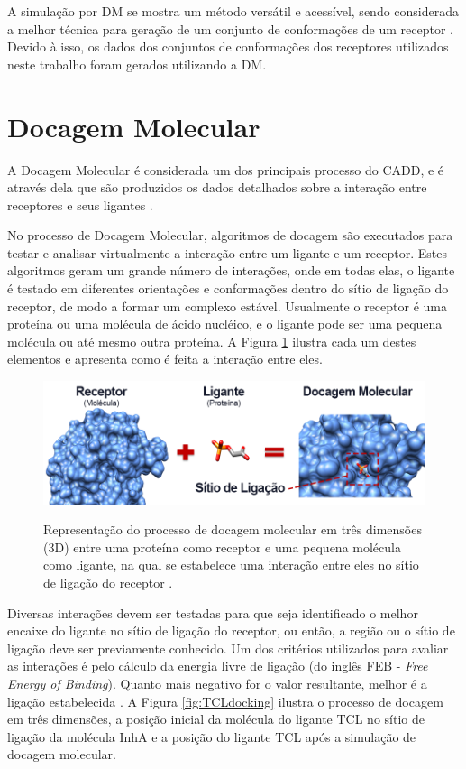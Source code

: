 A simulação por DM se mostra um método versátil e acessível, sendo considerada a melhor técnica para geração de um conjunto de conformações de um receptor \cite{kar11}. Devido à isso, os dados dos conjuntos de conformações dos receptores utilizados neste trabalho foram gerados utilizando a DM.


\section{Docagem Molecular}

A Docagem Molecular é considerada um dos principais processo do CADD, e é através dela que são produzidos os dados detalhados sobre a interação entre receptores e seus ligantes \cite{LEN96}. 

No processo de Docagem Molecular, algoritmos de docagem são executados para testar e analisar virtualmente a interação entre um ligante e um receptor. Estes algoritmos geram um grande número de interações, onde em todas elas, o ligante é testado em diferentes orientações e conformações dentro do sítio de ligação do receptor, de modo a formar um complexo estável. 
Usualmente o receptor é uma proteína ou uma molécula de ácido nucléico, e o ligante pode ser uma pequena molécula ou até mesmo outra proteína. A Figura \ref{fig:docking} \cite{ALE13} ilustra cada um destes elementos e apresenta como é feita a interação entre eles.

\begin{figure}[h]
	\center
	\includegraphics[width=14cm]{images/docking.png}
	\label{fig:docking}
	\caption{Representação do processo de docagem molecular em três dimensões (3D) entre uma proteína como receptor e uma pequena molécula como ligante, na qual se estabelece uma interação entre eles no sítio de ligação do receptor \cite{ALE13}.}
\end{figure}

Diversas interações devem ser testadas para que seja identificado o melhor encaixe do ligante no sítio de ligação do receptor, ou então, a região ou o sítio de ligação deve ser previamente conhecido. Um dos critérios utilizados para avaliar as interações é pelo cálculo da energia livre de ligação (do inglês FEB - \emph{Free Energy of Binding}). Quanto mais negativo for o valor resultante, melhor é a ligação estabelecida \cite{kar07}. A Figura \ref{fig:TCLdocking} \cite{REN13} ilustra o processo de docagem em três dimensões, a posição inicial da molécula do ligante TCL no sítio de ligação da molécula InhA e a posição do ligante TCL após a simulação de docagem molecular.

